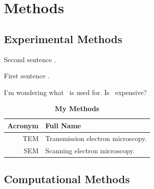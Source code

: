 \chapter{Methods}

\section{Experimental Methods}
\label{sec:expmeth}

Second sentence \SEM.

First sentence \SEM.


I'm wondering what \PE\ is used for. Is \PE\ expensive?


\begin{table}[t]
  \centering
  \caption{\textbf{My Methods}}
  \vspace{6pt}
  \renewcommand{\arraystretch}{1.5}
  \begin{tabular}{|r|l|}
    \hline
    \textbf{Acronym} & \textbf{Full Name} \\
    \hline
    TEM & Transmission electron microscopy. \\
    \hline
    SEM & Scanning electron microscopy. \\
    \hline
  \end{tabular}
  \label{tab:meth}
\end{table}

\section{Computational Methods}
\label{sec:compmeth}


% 				
% 



